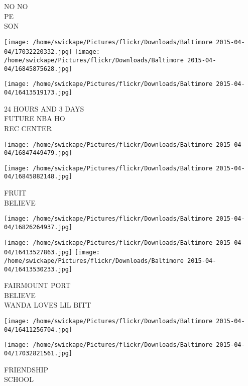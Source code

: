 \documentclass[10pt,letterpaper]{article}
\begin{document}
NO NO\\
PE\\
SON\\
\pagebreak

\texttt{[image: /home/swickape/Pictures/flickr/Downloads/Baltimore 2015-04-04/17032220332.jpg]}
\texttt{[image: /home/swickape/Pictures/flickr/Downloads/Baltimore 2015-04-04/16845875628.jpg]}

\vspace{0.25in}
\texttt{[image: /home/swickape/Pictures/flickr/Downloads/Baltimore 2015-04-04/16413519173.jpg]}

24 HOURS AND 3 DAYS\\
FUTURE NBA HO\\
REC CENTER\\
\pagebreak

\texttt{[image: /home/swickape/Pictures/flickr/Downloads/Baltimore 2015-04-04/16847449479.jpg]}

\vspace{0.25in}
\texttt{[image: /home/swickape/Pictures/flickr/Downloads/Baltimore 2015-04-04/16845882148.jpg]}

FRUIT\\
BELIEVE\\
\pagebreak

\texttt{[image: /home/swickape/Pictures/flickr/Downloads/Baltimore 2015-04-04/16826264937.jpg]}

\vspace{0.25in}
\texttt{[image: /home/swickape/Pictures/flickr/Downloads/Baltimore 2015-04-04/16413527863.jpg]}
\texttt{[image: /home/swickape/Pictures/flickr/Downloads/Baltimore 2015-04-04/16413530233.jpg]}

FAIRMOUNT PORT\\
BELIEVE\\
WANDA LOVES LIL BITT\\
\pagebreak

\texttt{[image: /home/swickape/Pictures/flickr/Downloads/Baltimore 2015-04-04/16411256704.jpg]}

\vspace{0.25in}
\texttt{[image: /home/swickape/Pictures/flickr/Downloads/Baltimore 2015-04-04/17032821561.jpg]}

FRIENDSHIP\\
SCHOOL\\
\pagebreak
\end{document}
